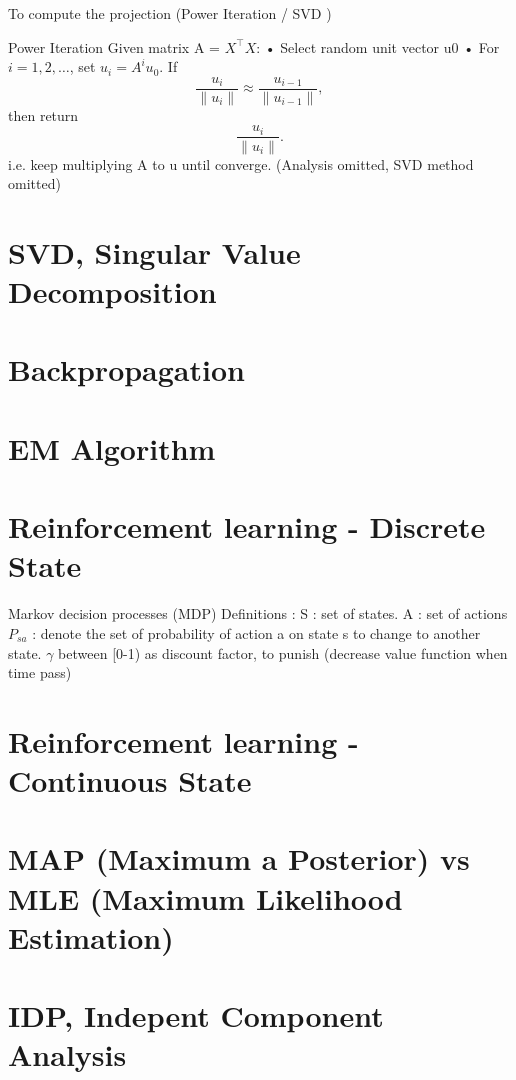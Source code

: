 \documentclass{article}
\begin{document}
To compute the projection (Power Iteration / SVD )

 Power Iteration
 Given matrix A =  \(X^\top X\):
 • Select random unit vector u0 \newline
 • For \( i = 1, 2, \dots \), set \( u_i = A^i u_0 \). If 
\[
\frac{u_i}{\|u_i\|} \approx \frac{u_{i-1}}{\|u_{i-1}\|},
\]
then return 
\[
\frac{u_i}{\|u_i\|}.
\]
i.e. keep multiplying  A to u until converge. (Analysis omitted, SVD method omitted)

\section{SVD, Singular Value Decomposition}
\section{Backpropagation}
\section{EM Algorithm}
\section{Reinforcement learning - Discrete State}
Markov decision processes (MDP) \newline
Definitions :  \newline
S : set of states. \newline 
A : set of  actions \newline 
\(P_{sa}\) : denote the set of  probability of action a on state s to change to another state. \newline
\(\gamma\) between [0-1) as discount factor, to punish (decrease value function when time pass) \newline


\section{Reinforcement learning - Continuous State}
\section{MAP (Maximum a Posterior) vs MLE (Maximum Likelihood Estimation)} 
\section{IDP, Indepent Component Analysis}
\end{document}
